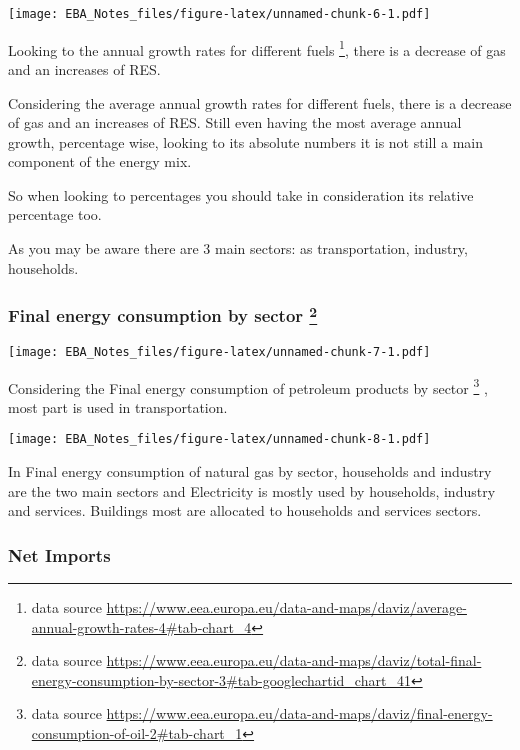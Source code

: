 \documentclass[]{book}
\let\rmarkdownfootnote\footnote%
\def\footnote{\protect\rmarkdownfootnote}
\theoremstyle{definition}
\theoremstyle{definition}
\theoremstyle{definition}
\theoremstyle{remark}
\begin{document}
\texttt{[image: EBA\_Notes\_files/figure-latex/unnamed-chunk-6-1.pdf]}

Looking to the annual growth rates for different fuels \footnote{data
  source
  \url{https://www.eea.europa.eu/data-and-maps/daviz/average-annual-growth-rates-4\#tab-chart_4}},
there is a decrease of gas and an increases of RES.

Considering the average annual growth rates for different fuels, there
is a decrease of gas and an increases of RES. Still even having the most
average annual growth, percentage wise, looking to its absolute numbers
it is not still a main component of the energy mix.

So when looking to percentages you should take in consideration its
relative percentage too.

As you may be aware there are 3 main sectors: as transportation,
industry, households.

\subsubsection[Final energy consumption by sector
]{\texorpdfstring{Final energy consumption by sector \footnote{data
  source
  \url{https://www.eea.europa.eu/data-and-maps/daviz/total-final-energy-consumption-by-sector-3\#tab-googlechartid_chart_41}}}{Final energy consumption by sector }}\label{final-energy-consumption-by-sector-5}

\texttt{[image: EBA\_Notes\_files/figure-latex/unnamed-chunk-7-1.pdf]}

Considering the Final energy consumption of petroleum products by sector
\footnote{data source
  \url{https://www.eea.europa.eu/data-and-maps/daviz/final-energy-consumption-of-oil-2\#tab-chart_1}}
, most part is used in transportation.

\texttt{[image: EBA\_Notes\_files/figure-latex/unnamed-chunk-8-1.pdf]}

In Final energy consumption of natural gas by sector, households and
industry are the two main sectors and Electricity is mostly used by
households, industry and services. Buildings most are allocated to
households and services sectors.

\subsubsection{Net Imports}\label{net-imports}
\end{document}
